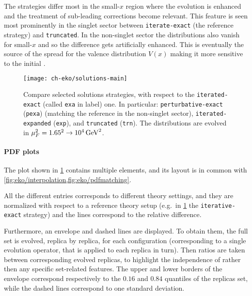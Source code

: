 The strategies differ most in the small-$x$ region where the \pdf{} evolution is
enhanced and the treatment of sub-leading corrections become relevant.
This feature is seen most prominently in the singlet sector between
\texttt{iterate-exact} (the reference strategy) and \texttt{truncated}.
In the non-singlet sector the distributions also vanish for small-$x$
and so the difference gets artificially enhanced.
This is eventually the source of the spread for the valence distribution $V(x)$
making it more sensitive to the initial \pdf{}.

\begin{figure}
    \centering
    \texttt{[image: ch-eko/solutions-main]}
    \caption{Compare selected solutions strategies, with respect to the
        \texttt{iterated-exact} (called \texttt{exa} in label) one. In
        particular: \texttt{perturbative-exact} (\texttt{pexa}) (matching
        the reference in the non-singlet sector),
        \texttt{iterated-expanded} (\texttt{exp}), and \texttt{truncated}
        (\texttt{trn}).
        The distributions are evolved in $\muF^2=\SI[parse-numbers=false]{1.65^2\to 10^4}{\GeV^2}$.}
    \label{fig:eko/solutions}
\end{figure}

\paragraph{PDF plots} The \pdf{} plot shown in \cref{fig:eko/solutions} contains
multiple elements, and its layout is in common with
\cref{fig:eko/interpolation,fig:eko/pdfmatching}.

All the different entries corresponds to different theory settings, and they
are normalized with respect to a reference theory setup
(e.g.\ in \cref{fig:eko/solutions} the \texttt{iterative\allowbreak-exact}
strategy) and the lines correspond to the relative difference.

Furthermore, an envelope and dashed lines are displayed.
To obtain them, the full \pdf{} set is evolved, replica by replica, for each
configuration (corresponding to a single evolution operator, that is applied to
each replica in turn).
Then ratios are taken between corresponding evolved replicas, to highlight
the \pdf{} independence of \eko{} rather then any specific set-related features.
The upper and lower borders of the envelope correspond respectively
to the $0.16$ and $0.84$ quantiles of the replicas set,
while the dashed lines correspond to one standard deviation.
